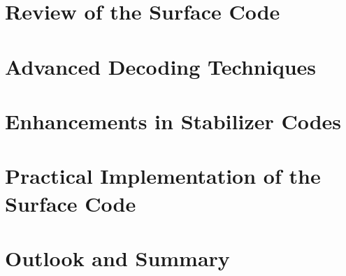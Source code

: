 \documentclass[final,5p,times,twocolumn,authoryear]{elsarticle}
\begin{document}
\section{Review of the Surface Code}
\label{review}


\section{Advanced Decoding Techniques}
\label{decoder}


\section{Enhancements in Stabilizer Codes}
\label{stabilizer}


\section{Practical Implementation of the Surface Code}
\label{algorithm}


\section{Outlook and Summary}
\label{outlook}


\nocite{*}  %



\end{document}
